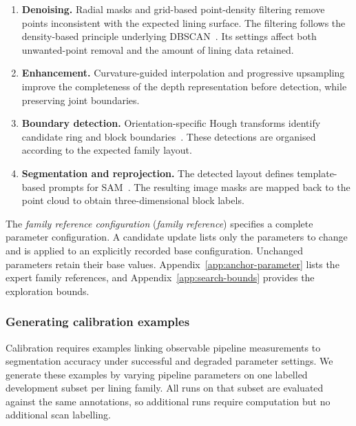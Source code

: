 \documentclass[a4paper,fleqn]{cas-dc}
\begin{document}
{\begin{enumerate}
\item \textbf{Denoising.}
Radial masks and grid-based point-density filtering remove points inconsistent with the expected lining surface. The filtering follows the density-based principle underlying DBSCAN~\cite{ester1996dbscan}. Its settings affect both unwanted-point removal and the amount of lining data retained.

\item \textbf{Enhancement.}
Curvature-guided interpolation and progressive upsampling improve the completeness of the depth representation before detection, while preserving joint boundaries.

\item \textbf{Boundary detection.}
Orientation-specific Hough transforms identify candidate ring and block boundaries~\cite{duda1972hough}. These detections are organised according to the expected family layout.

\item \textbf{Segmentation and reprojection.}
The detected layout defines template-based prompts for SAM~\cite{kirillov2023sam}. The resulting image masks are mapped back to the point cloud to obtain three-dimensional block labels.
\end{enumerate}

The \emph{family reference configuration} (\emph{family reference}) specifies a complete parameter configuration. A candidate update lists only the parameters to change and is applied to an explicitly recorded base configuration. Unchanged parameters retain their base values. Appendix~\ref{app:anchor-parameter} lists the expert family references, and Appendix~\ref{app:search-bounds} provides the exploration bounds.


\subsubsection{Generating calibration examples}
\label{sec:bo-experience}

Calibration requires examples linking observable pipeline measurements
to segmentation accuracy under successful and degraded parameter
settings. We generate these examples by varying pipeline parameters
on one labelled development subset per lining family. All runs on
that subset are evaluated against the same annotations, so additional
runs require computation but no additional scan labelling.

}
\end{document}
